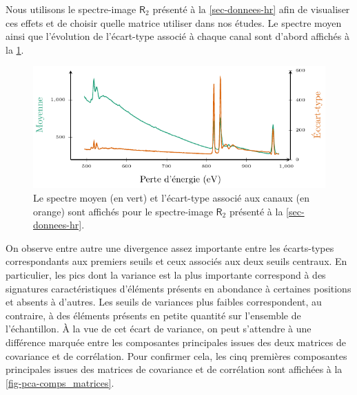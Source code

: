         Nous utilisons le spectre-image $\mathsf{R}_2$ présenté à la \cref{sec-donnees-hr} afin de visualiser ces effets et de choisir quelle matrice utiliser dans nos études.
        Le spectre moyen ainsi que l'évolution de l'écart-type associé à chaque canal sont d'abord affichés à la \cref{fig-pca-variance-data}.
        \begin{figure}
            \centering
            \includegraphics{img/chapitre1/figure16/data_variance.pdf}
            \caption{Le spectre moyen (en vert) et l'écart-type associé aux canaux (en orange) sont affichés pour le spectre-image $\mathsf{R}_2$ présenté à la \cref{sec-donnees-hr}.
                \protect\label{fig-pca-variance-data}}
        \end{figure}
        On observe entre autre une divergence assez importante entre les écarts-types correspondants aux premiers seuils et ceux associés aux deux seuils centraux. En particulier, les pics dont la variance est la plus importante correspond à des signatures caractéristiques d'éléments présents en abondance à certaines positions et absents à d'autres. Les seuils de variances plus faibles correspondent, au contraire, à des éléments présents en petite quantité sur l'ensemble de l'échantillon. \`A la vue de cet écart de variance, on peut s'attendre à une différence marquée entre les composantes principales issues des deux matrices de covariance et de corrélation. Pour confirmer cela, les cinq premières composantes principales issues des matrices de covariance et de corrélation sont affichées à la \cref{fig-pca-comps_matrices}.
